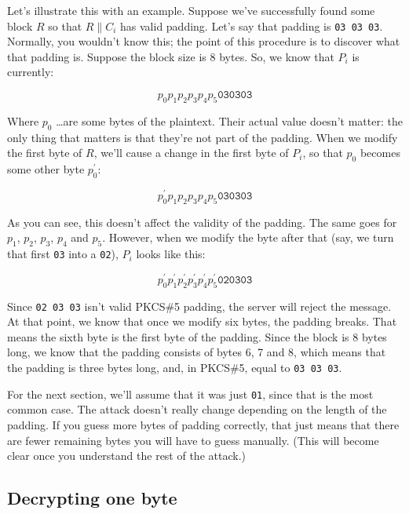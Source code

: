 \documentclass[11pt,ebook,table,dvipsnames]{memoir}
\begin{document}
Let's illustrate this with an example. Suppose we've successfully
found some block $R$ so that $R \| C_i$ has valid padding. Let's say
that padding is \verb~03 03 03~. Normally, you wouldn't know this; the
point of this procedure is to discover what that padding is. Suppose
the block size is 8 bytes. So, we know that $P_i$ is currently:

\begin{equation}
p_0 p_1 p_2 p_3 p_4 p_5 \mathtt{03} \mathtt{03} \mathtt{03}
\end{equation}

Where $p_0$ \ldots are some bytes of the plaintext. Their actual value
doesn't matter: the only thing that matters is that they're not part
of the padding. When we modify the first byte of $R$, we'll cause a
change in the first byte of $P_i$, so that $p_0$ becomes some other
byte $p^{\prime}_0$:

\begin{equation}
p^{\prime}_0 p_1 p_2 p_3 p_4 p_5 \mathtt{03} \mathtt{03} \mathtt{03}
\end{equation}

As you can see, this doesn't affect the validity of the padding. The
same goes for $p_1$, $p_2$, $p_3$, $p_4$ and $p_5$. However, when we
modify the byte after that (say, we turn that first \verb~03~ into a \verb~02~),
$P_i$ looks like this:

\begin{equation}
p^{\prime}_0 p^{\prime}_1 p^{\prime}_2 p^{\prime}_3 p^{\prime}_4 p^{\prime}_5 \mathtt{02} \mathtt{03} \mathtt{03}
\end{equation}

Since \verb~02 03 03~ isn't valid PKCS\#5 padding, the server will reject
the message. At that point, we know that once we modify six bytes, the
padding breaks. That means the sixth byte is the first byte of the
padding. Since the block is 8 bytes long, we know that the padding
consists of bytes 6, 7 and 8, which means that the padding is three
bytes long, and, in PKCS\#5, equal to \verb~03 03 03~.

For the next section, we'll assume that it was just \verb~01~, since that
is the most common case. The attack doesn't really change depending on
the length of the padding. If you guess more bytes of padding
correctly, that just means that there are fewer remaining bytes you
will have to guess manually. (This will become clear once you
understand the rest of the attack.)
\subsection{Decrypting one byte}
\label{sec-2-3-9-3}
\end{document}
